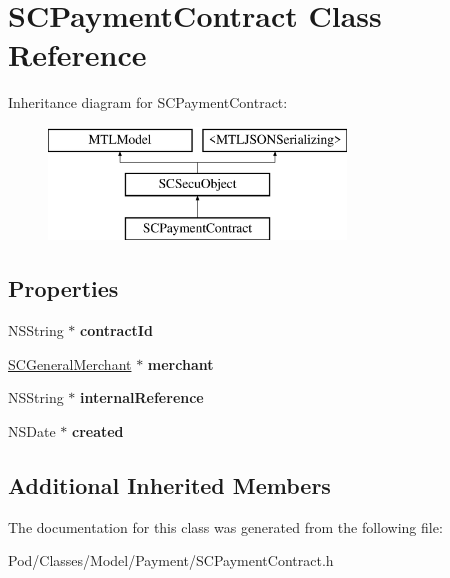 \hypertarget{interface_s_c_payment_contract}{}\section{S\+C\+Payment\+Contract Class Reference}
\label{interface_s_c_payment_contract}
Inheritance diagram for S\+C\+Payment\+Contract\+:\begin{figure}[H]
\begin{center}
\leavevmode
\includegraphics[height=3.000000cm]{interface_s_c_payment_contract}
\end{center}
\end{figure}
\subsection*{Properties}
\begin{DoxyCompactItemize}
\item 
N\+S\+String $\ast$ {\bfseries contract\+Id}\hypertarget{interface_s_c_payment_contract_a76c98b11d567a9cbd2482044d1e5a2b5}{}\label{interface_s_c_payment_contract_a76c98b11d567a9cbd2482044d1e5a2b5}

\item 
\hyperlink{interface_s_c_general_merchant}{S\+C\+General\+Merchant} $\ast$ {\bfseries merchant}\hypertarget{interface_s_c_payment_contract_a1832b0482e32bb396b1785b0333739cb}{}\label{interface_s_c_payment_contract_a1832b0482e32bb396b1785b0333739cb}

\item 
N\+S\+String $\ast$ {\bfseries internal\+Reference}\hypertarget{interface_s_c_payment_contract_affbb469c10a6d007cf6ba4507c9c148d}{}\label{interface_s_c_payment_contract_affbb469c10a6d007cf6ba4507c9c148d}

\item 
N\+S\+Date $\ast$ {\bfseries created}\hypertarget{interface_s_c_payment_contract_a0390f23d49b5c3be6b61e143bddf8932}{}\label{interface_s_c_payment_contract_a0390f23d49b5c3be6b61e143bddf8932}

\end{DoxyCompactItemize}
\subsection*{Additional Inherited Members}


The documentation for this class was generated from the following file\+:\begin{DoxyCompactItemize}
\item 
Pod/\+Classes/\+Model/\+Payment/S\+C\+Payment\+Contract.\+h\end{DoxyCompactItemize}
